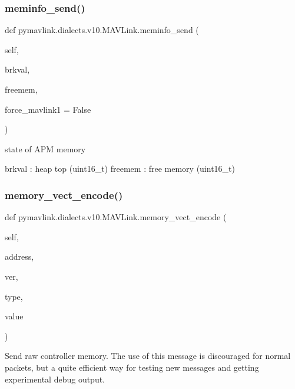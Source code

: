 \begin{DoxyVerb}
\begin{DoxyVerb}
\begin{DoxyVerb}
\begin{DoxyVerb}
\subsubsection{\texorpdfstring{meminfo\+\_\+send()}{meminfo\_send()}}
{\footnotesize\ttfamily def pymavlink.\+dialects.\+v10.\+M\+A\+V\+Link.\+meminfo\+\_\+send (\begin{DoxyParamCaption}\item[{}]{self,  }\item[{}]{brkval,  }\item[{}]{freemem,  }\item[{}]{force\+\_\+mavlink1 = {\ttfamily False} }\end{DoxyParamCaption})}

\begin{DoxyVerb}state of APM memory

brkval                    : heap top (uint16_t)
freemem                   : free memory (uint16_t)\end{DoxyVerb}
 \mbox{\label{classpymavlink_1_1dialects_1_1v10_1_1MAVLink_a741166ae277c38b82af972003eac3984}} 
\subsubsection{\texorpdfstring{memory\+\_\+vect\+\_\+encode()}{memory\_vect\_encode()}}
{\footnotesize\ttfamily def pymavlink.\+dialects.\+v10.\+M\+A\+V\+Link.\+memory\+\_\+vect\+\_\+encode (\begin{DoxyParamCaption}\item[{}]{self,  }\item[{}]{address,  }\item[{}]{ver,  }\item[{}]{type,  }\item[{}]{value }\end{DoxyParamCaption})}

\begin{DoxyVerb}Send raw controller memory. The use of this message is discouraged for
normal packets, but a quite efficient way for testing
new messages and getting experimental debug output.


\end{DoxyVerb}
\end{DoxyVerb}
\end{DoxyVerb}
\end{DoxyVerb}
\end{DoxyVerb}
